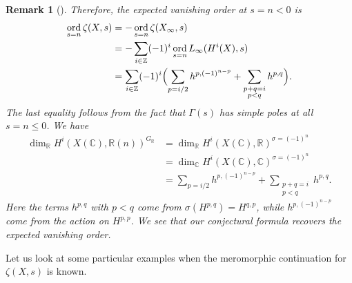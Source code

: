 \documentclass[10pt,a4paper,oneside,draft]{article}
\DeclareMathOperator{\ord}{ord}
\newcommand{\CC}{\mathbb{C}}
\newcommand{\RR}{\mathbb{R}}
\newcommand{\ZZ}{\mathbb{Z}}
\theoremstyle{myplain}
\theoremstyle{mydefinition}
\newtheorem{remark}[theorem]{Remark}
\numberwithin{equation}{section}
\begin{document}
\begin{remark}[{\cite[Proposition~5.13]{Flach-Morin-2018}}]
  Therefore, the expected vanishing order at $s = n < 0$ is
  \begin{align*}
    \ord_{s=n} \zeta (X,s) & = -\ord_{s=n} \zeta (X_\infty,s) \\
                           & = -\sum_{i\in \ZZ} (-1)^i \ord_{s=n} L_\infty (H^i (X), s) \\
                           & = \sum_{i\in \ZZ} (-1)^i \Bigl(\sum_{p = i/2} h^{p,(-1)^{n-p}} +
    \sum_{\substack{p + q = i \\ p < q}} h^{p,q}\Bigr).
  \end{align*}
  The last equality follows from the fact that $\Gamma (s)$ has simple poles at
  all $s = n \le 0$. We have
  \begin{align*}
    \dim_\RR H^i (X (\CC), \RR (n))^{G_\RR} & = \dim_\RR H^i (X (\CC), \RR)^{\sigma = (-1)^n} \\
                                            & = \dim_\CC H^i (X (\CC), \CC)^{\sigma = (-1)^n} \\
                                            & = \sum_{p = i/2} h^{p,(-1)^{n-p}} + \sum_{\substack{p + q = i \\ p < q}} h^{p,q}.
  \end{align*}
  Here the terms $h^{p,q}$ with $p < q$ come from $\sigma (H^{p,q}) = H^{q,p}$,
  while $h^{p,(-1)^{n-p}}$ come from the action on $H^{p,p}$.
  We see that our conjectural formula recovers the expected vanishing order.
\end{remark}

Let us look at some particular examples when the meromorphic continuation for
$\zeta (X,s)$ is known.
\end{document}
